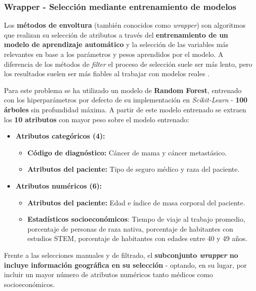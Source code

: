 \subsubsection{Wrapper - Selección mediante entrenamiento de modelos}

Los \textbf{métodos de envoltura} (también conocidos como \textit{wrapper}) son algoritmos que realizan su selección de atributos a través del \textbf{entrenamiento de un modelo de aprendizaje automático} y la selección de las variables más relevantes en base a los parámetros y pesos aprendidos por el modelo. A diferencia de los métodos de \textit{filter} el proceso de selección suele ser más lento, pero los resultados suelen ser más fiables al trabajar con modelos reales \cite{featureselection}.

Para este problema se ha utilizado un modelo de \textbf{Random Forest}, entrenado con los hiperparámetros por defecto de su implementación en \textit{Scikit-Learn} - \textbf{100 árboles} sin profundidad máxima. A partir de este modelo entrenado se extraen los \textbf{10 atributos} con mayor peso sobre el modelo entrenado: 

\begin{itemize}[parsep=1pt, itemsep=1pt, topsep=4pt]
	\item \textbf{Atributos categóricos (4):} 
	\begin{itemize}[parsep=1pt, itemsep=1pt, topsep=4pt]
		\item \textbf{Código de diagnóstico:} Cáncer de mama y cáncer metastásico.
		\item \textbf{Atributos del paciente:} Tipo de seguro médico y raza del paciente.
	\end{itemize}
	\item \textbf{Atributos numéricos (6):}
	\begin{itemize}[parsep=1pt, itemsep=1pt, topsep=4pt]
		\item \textbf{Atributos del paciente:} Edad e índice de masa corporal del paciente.
		\item \textbf{Estadísticos socioeconómicos}: Tiempo de viaje al trabajo promedio, porcentaje de personas de raza nativa, porcentaje de habitantes con estudios STEM, porcentaje de habitantes con edades entre 40 y 49 años.
	\end{itemize}
\end{itemize}

Frente a las selecciones manuales y de filtrado, el \textbf{subconjunto \textit{wrapper} no incluye información geográfica en su selección} - optando, en su lugar, por incluir un mayor número de atributos numéricos tanto médicos como socioeconómicos.

